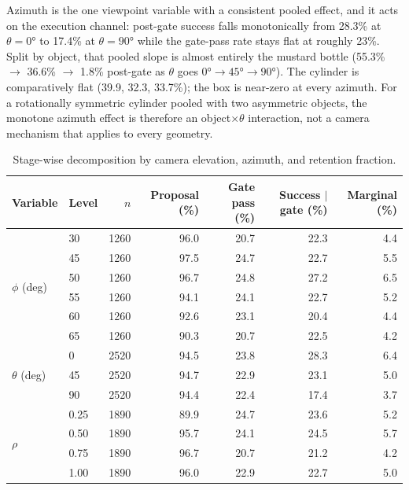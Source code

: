 \documentclass[11pt,a4paper]{report}
\begin{document}
Azimuth is the one viewpoint variable with a consistent pooled effect, and it acts on the execution channel: post-gate success falls monotonically from 28.3\% at $\theta = 0°$ to 17.4\% at $\theta = 90°$ while the gate-pass rate stays flat at roughly 23\%. Split by object, that pooled slope is almost entirely the mustard bottle (55.3\% $\to$ 36.6\% $\to$ 1.8\% post-gate as $\theta$ goes $0°\to 45°\to 90°$). The cylinder is comparatively flat (39.9, 32.3, 33.7\%); the box is near-zero at every azimuth. For a rotationally symmetric cylinder pooled with two asymmetric objects, the monotone azimuth effect is therefore an object$\times\theta$ interaction, not a camera mechanism that applies to every geometry.

\begin{table}[t]
  \caption{Stage-wise decomposition by camera elevation, azimuth, and retention fraction.}
  \label{tab:decomp_view}
  \centering
  \begin{tabular}{llrrrrr}
    \toprule
    \textbf{Variable} & \textbf{Level} & $n$ & \textbf{Proposal (\%)} & \textbf{Gate pass (\%)} & \textbf{Success $\mid$ gate (\%)} & \textbf{Marginal (\%)} \\
    \midrule
    \multirow{6}{*}{$\phi$ (deg)}
      & 30 & 1260 & 96.0 & 20.7 & 22.3 & 4.4 \\
      & 45 & 1260 & 97.5 & 24.7 & 22.7 & 5.5 \\
      & 50 & 1260 & 96.7 & 24.8 & 27.2 & 6.5 \\
      & 55 & 1260 & 94.1 & 24.1 & 22.7 & 5.2 \\
      & 60 & 1260 & 92.6 & 23.1 & 20.4 & 4.4 \\
      & 65 & 1260 & 90.3 & 20.7 & 22.5 & 4.2 \\
    \midrule
    \multirow{3}{*}{$\theta$ (deg)}
      &  0 & 2520 & 94.5 & 23.8 & 28.3 & 6.4 \\
      & 45 & 2520 & 94.7 & 22.9 & 23.1 & 5.0 \\
      & 90 & 2520 & 94.4 & 22.4 & 17.4 & 3.7 \\
    \midrule
    \multirow{4}{*}{$\rho$}
      & 0.25 & 1890 & 89.9 & 24.7 & 23.6 & 5.2 \\
      & 0.50 & 1890 & 95.7 & 24.1 & 24.5 & 5.7 \\
      & 0.75 & 1890 & 96.7 & 20.7 & 21.2 & 4.2 \\
      & 1.00 & 1890 & 96.0 & 22.9 & 22.7 & 5.0 \\
    \bottomrule
  \end{tabular}
\end{table}
\end{document}
